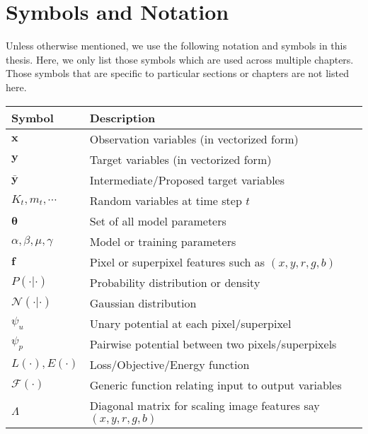 \chapter{Symbols and Notation}
\label{chap:symbols}

\newcommand{\obs}{\mathbf{x}}
\newcommand{\target}{\mathbf{y}}
\newcommand{\targetProp}{\bar{\mathbf{y}}}
\newcommand{\params}{\mathbf{\theta}}
\newcommand{\f}{\mathbf{f}}
\newcommand{\func}{\mathcal{F}}

\newcommand{\eg}{\textit{e.g.}\@\xspace}
\newcommand{\ie}{\textit{i.e.}\@\xspace}
\newcommand{\ala}{\textit{\'{a}~la}\@\xspace}
\newcommand{\etal}{\textit{et~al.}\@\xspace}

Unless otherwise mentioned, we use the following notation and symbols in this
thesis. Here, we only list those symbols which are used across multiple chapters.
Those symbols that are specific to particular sections or chapters are not
listed here.

\begin{longtable}[l]{p{50pt} p{300pt}}
\toprule
\textbf{Symbol}	& \textbf{Description} \\
\midrule
$\obs$	 	& Observation variables (in vectorized form)\\
$\target$	 	& Target variables (in vectorized form)\\
$\targetProp$	 	& Intermediate/Proposed target variables\\
$K_t,m_t,\cdots$	 	& Random variables at time step $t$\\
$\params$	 	& Set of all model parameters \\
$\alpha, \beta, \mu, \gamma$	 & Model or training parameters \\
$\f$	 	& Pixel or superpixel features such as $(x,y,r,g,b)$ \\
$P(\cdot|\cdot)$	&  Probability distribution or density \\
$\mathcal{N}(\cdot|\cdot)$	& Gaussian distribution \\
$\psi_u$ & Unary potential at each pixel/superpixel \\
$\psi_p$ & Pairwise potential between two pixels/superpixels \\
$L(\cdot), E(\cdot)$ & Loss/Objective/Energy function \\
$\func(\cdot)$ & Generic function relating input to output variables \\
$\Lambda$ & Diagonal matrix for scaling image features say $(x,y,r,g,b)$ \\
\bottomrule
\end{longtable}
